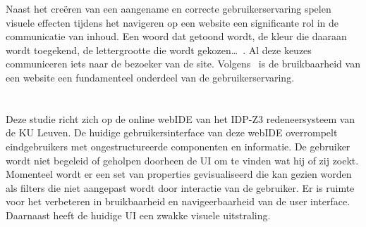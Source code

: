 Naast het creëren van een aangename en correcte gebruikerservaring spelen visuele effecten tijdens het navigeren op een website een significante rol in de communicatie van inhoud. Een woord dat getoond wordt, de kleur die daaraan wordt toegekend, de lettergrootte die wordt gekozen…~\autocite{bordbar2016}. Al deze keuzes communiceren iets naar de bezoeker van de site. Volgens~\textcite{Lee2012} is de bruikbaarheid van een website een fundamenteel onderdeel van de gebruikerservaring.

\section{}%
\label{sec:probleemstelling}
Deze studie richt zich op de online webIDE van het IDP-Z3 redeneersysteem van de KU Leuven. De huidige gebruikersinterface van deze webIDE overrompelt eindgebruikers met ongestructureerde componenten en informatie. De gebruiker wordt niet begeleid of geholpen doorheen de UI om te vinden wat hij of zij zoekt. Momenteel wordt er een set van properties gevisualiseerd die kan gezien worden als filters die niet aangepast wordt door interactie van de gebruiker. Er is ruimte voor het verbeteren in bruikbaarheid en navigeerbaarheid van de user interface. Daarnaast heeft de huidige UI een zwakke visuele uitstraling.


